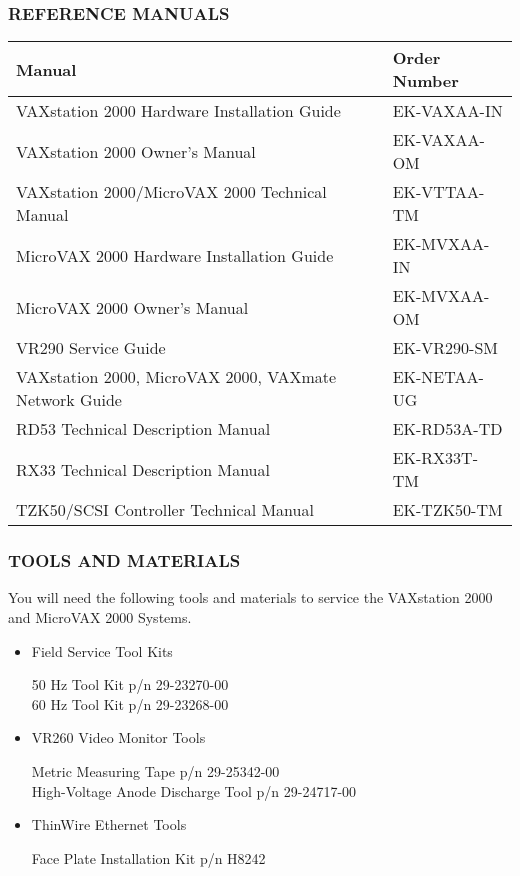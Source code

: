 \documentclass{decsectional}
\begin{document}
\subsubsection*{REFERENCE MANUALS}
\begin{tabularx}{\textwidth}{l l}
\hline
\textbf{Manual} & \textbf{Order Number} \\
\hline
VAXstation 2000 Hardware Installation Guide & EK-VAXAA-IN \\
VAXstation 2000 Owner's Manual & EK-VAXAA-OM \\
VAXstation 2000/MicroVAX 2000 Technical Manual & EK-VTTAA-TM \\
MicroVAX 2000 Hardware Installation Guide & EK-MVXAA-IN \\
MicroVAX 2000 Owner's Manual & EK-MVXAA-OM \\
VR290 Service Guide & EK-VR290-SM \\
VAXstation 2000, MicroVAX 2000, VAXmate Network Guide & EK-NETAA-UG \\
RD53 Technical Description Manual & EK-RD53A-TD \\
RX33 Technical Description Manual & EK-RX33T-TM \\
TZK50/SCSI Controller Technical Manual & EK-TZK50-TM \\
\hline

\end{tabularx}

\subsubsection*{TOOLS AND MATERIALS}
You will need the following tools and materials to service the VAXstation
2000 and MicroVAX 2000 Systems.

\begin{itemize}
\item Field Service Tool Kits

50 Hz Tool Kit p/n 29-23270-00\\
60 Hz Tool Kit p/n 29-23268-00

\item VR260 Video Monitor Tools

Metric Measuring Tape p/n 29-25342-00\\
High-Voltage Anode Discharge Tool p/n 29-24717-00

\item ThinWire Ethernet Tools

Face Plate Installation Kit p/n H8242
\end{itemize}
\end{document}

